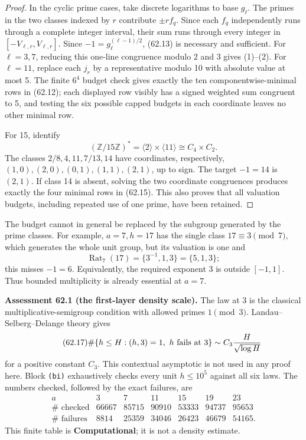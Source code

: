 \documentclass[10pt,reqno]{amsart}
\theoremstyle{definition}
\newcommand{\1}{\mathbf 1}
\begin{document}
\begin{proof}
In the cyclic prime cases, take discrete logarithms to base $g_\ell$.  The
primes in the two classes indexed by $r$ contribute $\mathord\pm r f_q$.
Since each $f_q$ independently runs through a complete integer interval,
their sum runs through every integer in
$[-V_{\ell,r},V_{\ell,r}]$.  Since
$-1=g_\ell^{(\ell-1)/2}$, (62.13) is necessary and sufficient.  For
$\ell=3,7$, reducing this one-line congruence modulo 2 and 3 gives
(1)--(2).  For $\ell=11$, replace each $j_r$ by a representative modulo 10
with absolute value at most 5.  The finite $6^4$ budget check gives exactly
the ten componentwise-minimal rows in (62.12); each displayed row visibly
has a signed weighted sum congruent to 5, and testing the six possible
capped budgets in each coordinate leaves no other minimal row.

For 15, identify
\[
 (\mathbb Z/15\mathbb Z)^*=\langle2\rangle\times\langle11\rangle
       \cong C_4\times C_2.
\]
The classes $2/8,4,11,7/13,14$ have coordinates, respectively,
$(1,0),(2,0),(0,1),(1,1),(2,1)$, up to sign.  The target $-1=14$ is
$(2,1)$.  If class 14 is absent, solving the two coordinate congruences
produces exactly the four minimal rows in (62.15).  This also proves that
all valuation budgets, including repeated use of one prime, have been
retained.
\end{proof}

The budget cannot in general be replaced by the subgroup generated by the
prime classes.  For example, $a=7,h=17$ has the single class
$17\equiv3\pmod7$, which generates the whole unit group, but its valuation
is one and
\begin{equation}\tag{62.16}
 \operatorname {Rat}_7(17)=\{3^{-1},1,3\}=\{5,1,3\};
\end{equation}
this misses $-1=6$.  Equivalently, the required exponent 3 is outside
$[-1,1]$.  Thus bounded multiplicity is already essential at $a=7$.

\medskip\noindent\textbf{Assessment 62.1 (the first-layer density scale).}
The law at 3 is the classical multiplicative-semigroup condition with
allowed primes $1\pmod3$.  Landau--Selberg--Delange theory gives
\begin{equation}\tag{62.17}
 \#\{h\leq H:(h,3)=1,\ h\text{ fails at }3\}
       \sim C_3{H\over\sqrt{\log H}}
\end{equation}
for a positive constant $C_3$.  This contextual asymptotic is not used in
any proof here.  Block \texttt{(bi)} exhaustively checks every unit
$h\leq10^5$ against all six laws.  The numbers checked, followed by the
exact failures, are
\begin{equation}\tag{62.18}
\begin{array}{c|rrrrrr}
a&3&7&11&15&19&23\\ \hline
\#\text{ checked}&66667&85715&90910&53333&94737&95653\\
\#\text{ failures}&8814&25359&34046&26423&46679&54165.
\end{array}
\end{equation}
This finite table is \textbf{Computational}; it is not a density estimate.
\end{document}
